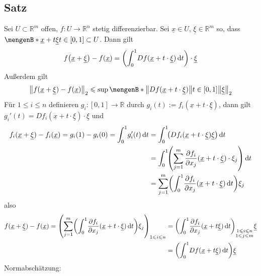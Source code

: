\subsection[Satz: Mittelwertsatz für vektorwertige Funktionen mehrerer Variablen]{Satz} %
\label{sub:711}
Sei $U \subset \mathds{R}^m$ offen, $f : U \to \mathds{R}^n$ stetig differenzierbar. Sei $\underline{x} \in U$, $\underline{\xi} \in \mathds{R}^m$ so, dass 
$\set[\underline{x} + t \underline{\xi}]{t \in [0,1]} \subset U $. Dann gilt 
\[
	f \enbrace*{\underline{x} + \underline{\xi}} - f(\underline{x}) =  \enbrace*{\int_{0} ^{1} \! D f (\underline{x}+t  \cdot \underline{\xi}) \,\mathrm{d}t} 
	\cdot \underline{\xi}
\]
Außerdem gilt 
\[
	\norm[2]{f( \underline{x} + \underline{\xi}) -f (\underline{x})} \le \sup \set[{\norm{D f( \underline{x} + t \cdot \underline{\xi})}}]{t \in [0,1]} 	\norm[2]{\underline{\xi}}   
\]
Für $1 \le i \le n$ definieren $g_i : [0,1] \to \mathds{R}$ durch $g_i(t) := f_i ( \underline{x} + t \cdot \underline{\xi})$, dann gilt 
$g_i '(t) = D f_i ( \underline{x} + t \cdot \underline{\xi}) \cdot \underline{\xi}$ und 
\begin{align*}
	f_i(\underline{x} + \underline{\xi}) - f_i(\underline{x}) = g_i (1) - g_i(0) = \int_{0} ^{1} \! g_i'(t)  \, \mathrm{d}t &= \int_{0} ^{1} \! \enbrace*{D f_i (\underline{x} + t \cdot \underline{\xi}) \underline{\xi}}  \, \mathrm{d}t \\
	&= \int_{0} ^{1} \! \enbrace*{\sum_{j=1}^{m} \diff{f_i}{x_j} ( \underline{x} + t \cdot \underline{\xi}) \cdot \xi_j}  \, \mathrm{d}t \\
	&= \sum_{j=1}^{m} \enbrace*{\int_{0} ^{1} \! \diff{f_i}{x_j} ( \underline{x} + t \cdot \underline{\xi})  \, \mathrm{d}t} \xi_j
\end{align*}
also
\begin{align*}
	f(\underline{x} + \underline{\xi}) - f(\underline{x}) = \enbrace*{\sum_{j=1}^{m} \enbrace*{\int_{0} ^{1} \! \diff{f_i}{x_j} ( \underline{x} + t \cdot \underline{\xi})  \, \mathrm{d}t} \xi_j }_{1 \le i \le n} &= \enbrace*{\int_{0} ^{1} \! \diff{f_i}{x_j} (\underline{x} + t \underline{\xi})  \, \mathrm{d}t}_{\substack{1 \le i \le n \\
	1 \le j \le m}} \underline{\xi} \\
	&= \enbrace*{\int_{0} ^{1} \!  D f( \underline{x} + t \underline{\xi})  \, \mathrm{d}t} \underline{\xi}
\end{align*}
Normabschätzung: 
